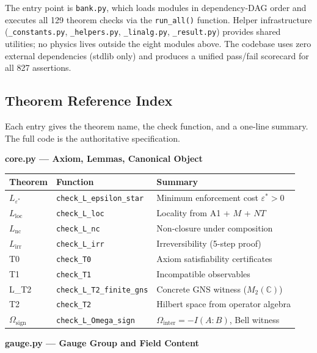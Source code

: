 \documentclass[11pt]{article}
\begin{document}
\noindent The entry point is \texttt{bank.py}, which loads modules in dependency-DAG order and executes all 129 theorem checks via the \texttt{run\_all()} function.  Helper infrastructure (\texttt{\_constants.py}, \texttt{\_helpers.py}, \texttt{\_linalg.py}, \texttt{\_result.py}) provides shared utilities; no physics lives outside the eight modules above.  The codebase uses zero external dependencies (stdlib only) and produces a unified pass/fail scorecard for all 827 assertions.

\subsection*{Theorem Reference Index}

Each entry gives the theorem name, the check function, and a one-line summary.  The full code is the authoritative specification.

\medskip
\noindent\textbf{core.py --- Axiom, Lemmas, Canonical Object}

\smallskip
\begin{center}
\small
\begin{tabular}{lll}
\toprule
\textbf{Theorem} & \textbf{Function} & \textbf{Summary} \\
\midrule
$L_{\varepsilon^*}$ & \texttt{check\_L\_epsilon\_star} & Minimum enforcement cost $\varepsilon^* > 0$ \\
$L_{\mathrm{loc}}$ & \texttt{check\_L\_loc} & Locality from A1 + $M$ + $NT$ \\
$L_{\mathrm{nc}}$ & \texttt{check\_L\_nc} & Non-closure under composition \\
$L_{\mathrm{irr}}$ & \texttt{check\_L\_irr} & Irreversibility (5-step proof) \\
T0 & \texttt{check\_T0} & Axiom satisfiability certificates \\
T1 & \texttt{check\_T1} & Incompatible observables \\
L\_T2 & \texttt{check\_L\_T2\_finite\_gns} & Concrete GNS witness ($M_2(\mathbb{C})$) \\
T2 & \texttt{check\_T2} & Hilbert space from operator algebra \\
$\Omega_{\mathrm{sign}}$ & \texttt{check\_L\_Omega\_sign} & $\Omega_{\mathrm{inter}} = -I(A{:}B)$, Bell witness \\
\bottomrule
\end{tabular}
\end{center}

\medskip
\noindent\textbf{gauge.py --- Gauge Group and Field Content}
\end{document}
